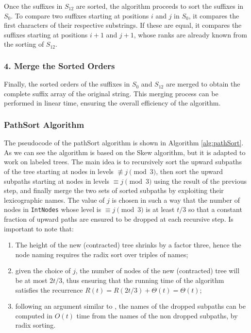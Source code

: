 Once the suffixes in $S_{12}$ are sorted, the algorithm proceeds to sort the suffixes in $S_0$. To compare two suffixes starting at positions $i$ and $j$ in $S_0$, it compares the first characters of their respective substrings. If these are equal, it compares the suffixes starting at positions $i+1$ and $j+1$, whose ranks are already known from the sorting of $S_{12}$.

\subsubsection*{4. Merge the Sorted Orders}

Finally, the sorted orders of the suffixes in $S_0$ and $S_{12}$ are merged to obtain the complete suffix array of the original string. This merging process can be performed in linear time, ensuring the overall efficiency of the algorithm.

\subsubsection{PathSort Algorithm}

The pseudocode of the pathSort algorithm is shown in Algorithm \ref{alg:pathSort}. As we can see the algorithm is based on the Skew algorithm, but it is adapted to work on labeled trees. The main idea is to recursively sort the upward subpaths of the tree starting at nodes in levels $\not\equiv j \pmod{3}$, then sort the upward subpaths starting at nodes in levels $\equiv j \pmod{3}$ using the result of the previous step, and finally merge the two sets of sorted subpaths by exploiting their lexicographic names. The value of $j$ is chosen in such a way that the number of nodes in \texttt{IntNodes} whose level is $\equiv j \pmod{3}$ is at least $t/3$ so that a constant fraction of upward paths are ensured to be dropped at each recursive step. Is important to note that:
\begin{enumerate}
    \item The height of the new (contracted) tree shrinks by a factor three, hence the node naming requires the radix sort over triples of names; 
    \item given the choice of $j$, the number of nodes of the new (contracted) tree will be at most $2t/3$, thus ensuring that the running time of the algorithm satisfies the recurrence $R(t) = R(2t/3) + \Theta(t) = \Theta(t)$; 
    \item following an argument similar to \cite{karkkainen2006linear}, the names of the dropped subpaths can be computed in $O(t)$ time from the names of the non dropped subpaths, by radix sorting.
\end{enumerate}

